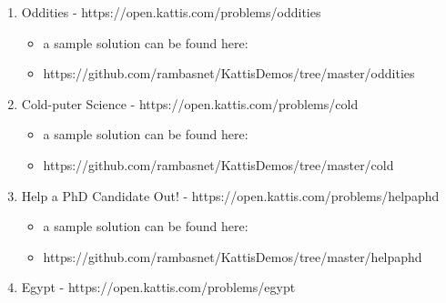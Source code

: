 \documentclass[11pt]{article}
\providecommand{\tightlist}{%
      \setlength{\itemsep}{0pt}\setlength{\parskip}{0pt}}
\begin{document}
\begin{enumerate}
\def\labelenumi{\arabic{enumi}.}
\item
  Oddities - https://open.kattis.com/problems/oddities

  \begin{itemize}
  \tightlist
  \item
    a sample solution can be found here:
  \item
    https://github.com/rambasnet/KattisDemos/tree/master/oddities
  \end{itemize}
\item
  Cold-puter Science - https://open.kattis.com/problems/cold

  \begin{itemize}
  \tightlist
  \item
    a sample solution can be found here:
  \item
    https://github.com/rambasnet/KattisDemos/tree/master/cold
  \end{itemize}
\item
  Help a PhD Candidate Out! - https://open.kattis.com/problems/helpaphd

  \begin{itemize}
  \tightlist
  \item
    a sample solution can be found here:
  \item
    https://github.com/rambasnet/KattisDemos/tree/master/helpaphd
  \end{itemize}
\item
  Egypt - https://open.kattis.com/problems/egypt


\end{enumerate}
\end{document}
